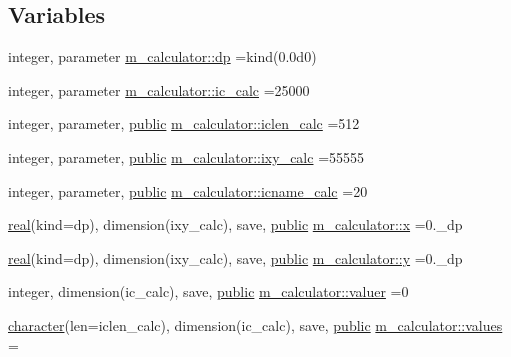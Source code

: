 \subsection*{Variables}
\begin{DoxyCompactItemize}
\item 
integer, parameter \hyperlink{namespacem__calculator_aefb5a6c3001bb0f09ed82decb6def950}{m\+\_\+calculator\+::dp} =kind(0.\+0d0)
\item 
integer, parameter \hyperlink{namespacem__calculator_a462e5bf8d038196149ba96c22a614284}{m\+\_\+calculator\+::ic\+\_\+calc} =25000
\item 
integer, parameter, \hyperlink{M__stopwatch_83_8txt_a2f74811300c361e53b430611a7d1769f}{public} \hyperlink{namespacem__calculator_accf705491e8bd9b3d2f0d04fd13712e7}{m\+\_\+calculator\+::iclen\+\_\+calc} =512
\item 
integer, parameter, \hyperlink{M__stopwatch_83_8txt_a2f74811300c361e53b430611a7d1769f}{public} \hyperlink{namespacem__calculator_addb6e867e526d278a9901ef8e7ff8bb6}{m\+\_\+calculator\+::ixy\+\_\+calc} =55555
\item 
integer, parameter, \hyperlink{M__stopwatch_83_8txt_a2f74811300c361e53b430611a7d1769f}{public} \hyperlink{namespacem__calculator_a482f8880712dc8f52ef6833de3243875}{m\+\_\+calculator\+::icname\+\_\+calc} =20
\item 
\hyperlink{read__watch_83_8txt_abdb62bde002f38ef75f810d3a905a823}{real}(kind=dp), dimension(ixy\+\_\+calc), save, \hyperlink{M__stopwatch_83_8txt_a2f74811300c361e53b430611a7d1769f}{public} \hyperlink{namespacem__calculator_a92431c21aee174f56eab4bd7afbb8aba}{m\+\_\+calculator\+::x} =0.\+\_\+dp
\item 
\hyperlink{read__watch_83_8txt_abdb62bde002f38ef75f810d3a905a823}{real}(kind=dp), dimension(ixy\+\_\+calc), save, \hyperlink{M__stopwatch_83_8txt_a2f74811300c361e53b430611a7d1769f}{public} \hyperlink{namespacem__calculator_affdb371c2a552e5a31bfe542a2b837cd}{m\+\_\+calculator\+::y} =0.\+\_\+dp
\item 
integer, dimension(ic\+\_\+calc), save, \hyperlink{M__stopwatch_83_8txt_a2f74811300c361e53b430611a7d1769f}{public} \hyperlink{namespacem__calculator_a7d1d50fdb797826d4722b3a6d2e38442}{m\+\_\+calculator\+::valuer} =0
\item 
\hyperlink{option__stopwatch_83_8txt_abd4b21fbbd175834027b5224bfe97e66}{character}(len=iclen\+\_\+calc), dimension(ic\+\_\+calc), save, \hyperlink{M__stopwatch_83_8txt_a2f74811300c361e53b430611a7d1769f}{public} \hyperlink{namespacem__calculator_ad2574ef504a32d93ad0c76a9a8e1c626}{m\+\_\+calculator\+::values} =\textquotesingle{} \textquotesingle{}

\end{DoxyCompactItemize}
